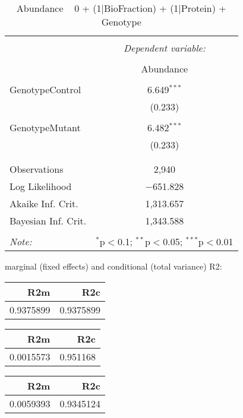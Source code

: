 \documentclass[11pt]{report}
\begin{document}
\begin{table}[!htbp] \centering 
  \caption{Abundance ~ 0 + (1|BioFraction) + (1|Protein) + Genotype} 
  \label{} 
\begin{tabular}{@{\extracolsep{5pt}}lc} 
\\[-1.8ex]\hline 
\hline \\[-1.8ex] 
 & \multicolumn{1}{c}{\textit{Dependent variable:}} \\ 
\cline{2-2} 
\\[-1.8ex] & Abundance \\ 
\hline \\[-1.8ex] 
 GenotypeControl & 6.649$^{***}$ \\ 
  & (0.233) \\ 
  & \\ 
 GenotypeMutant & 6.482$^{***}$ \\ 
  & (0.233) \\ 
  & \\ 
\hline \\[-1.8ex] 
Observations & 2,940 \\ 
Log Likelihood & $-$651.828 \\ 
Akaike Inf. Crit. & 1,313.657 \\ 
Bayesian Inf. Crit. & 1,343.588 \\ 
\hline 
\hline \\[-1.8ex] 
\textit{Note:}  & \multicolumn{1}{r}{$^{*}$p$<$0.1; $^{**}$p$<$0.05; $^{***}$p$<$0.01} \\ 
\end{tabular} 
\end{table} 
marginal (fixed effects) and conditional (total variance) R2:

\begin{tabular}{r|r}
\hline
R2m & R2c\\
\hline
0.9375899 & 0.9375899\\
\hline
\end{tabular}

\begin{tabular}{r|r}
\hline
R2m & R2c\\
\hline
0.0015573 & 0.951168\\
\hline
\end{tabular}

\begin{tabular}{r|r}
\hline
R2m & R2c\\
\hline
0.0059393 & 0.9345124\\
\hline
\end{tabular}
\end{document}
